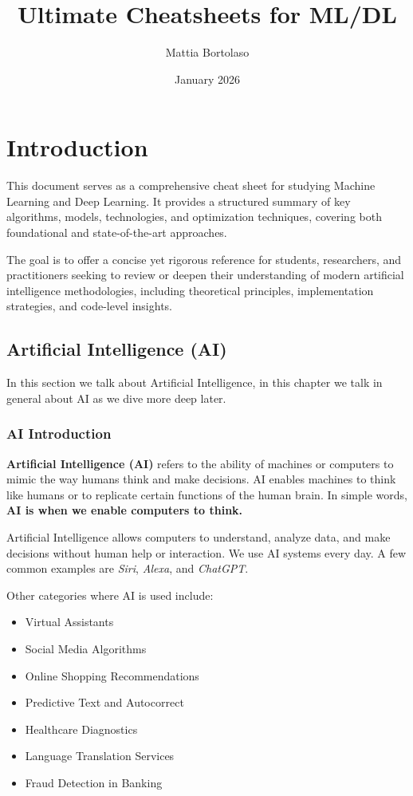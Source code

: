 \documentclass[12pt,a4paper]{report}
\title{Ultimate Cheatsheets for ML/DL}
\author{Mattia Bortolaso}
\date{January 2026}
\begin{document}
\maketitle
\tableofcontents
\clearpage

\maketitle

\chapter{Introduction}

This document serves as a comprehensive cheat sheet for studying Machine Learning and Deep Learning. 
It provides a structured summary of key algorithms, models, technologies, and optimization techniques, 
covering both foundational and state-of-the-art approaches. 

The goal is to offer a concise yet rigorous reference for students, researchers, and practitioners seeking 
to review or deepen their understanding of modern artificial intelligence methodologies, 
including theoretical principles, implementation strategies, and code-level insights.

\section{Artificial Intelligence (AI)}
In this section we talk about Artificial Intelligence, in this chapter we talk in general about AI as we dive more deep later.

\subsection{AI Introduction}

\textbf{Artificial Intelligence (AI)} refers to the ability of machines or computers to mimic the way humans think and make decisions.  
AI enables machines to think like humans or to replicate certain functions of the human brain.  
In simple words, \textbf{AI is when we enable computers to think.}

Artificial Intelligence allows computers to understand, analyze data, and make decisions without human help or interaction.  
We use AI systems every day. A few common examples are \textit{Siri}, \textit{Alexa}, and \textit{ChatGPT}.  

Other categories where AI is used include:
\begin{itemize}
    \item Virtual Assistants
    \item Social Media Algorithms
    \item Online Shopping Recommendations
    \item Predictive Text and Autocorrect
    \item Healthcare Diagnostics
    \item Language Translation Services
    \item Fraud Detection in Banking
\end{itemize}
\end{document}

